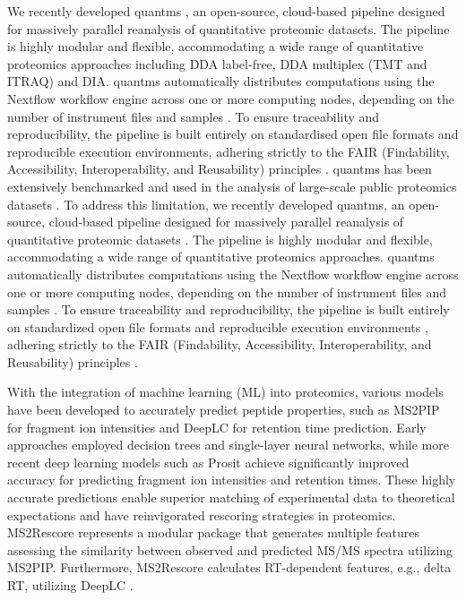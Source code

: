 \documentclass[12pt]{article}
\begin{document}
We recently developed quantms \cite{dai_quantms_2024}, an open-source, cloud-based pipeline designed for massively parallel reanalysis of quantitative proteomic datasets. The pipeline is highly modular and flexible, accommodating a wide range of quantitative proteomics approaches including DDA label-free, DDA multiplex (TMT and ITRAQ) and DIA. quantms automatically distributes computations using the Nextflow workflow engine across one or more computing nodes, depending on the number of instrument files and samples \cite{di_tommaso_nextflow_2017}. To ensure traceability and reproducibility, the pipeline is built entirely on standardised open file formats and reproducible execution environments, adhering strictly to the FAIR (Findability, Accessibility, Interoperability, and Reusability) principles \cite{wilkinson_fair_2016}. quantms has been extensively benchmarked and used in the analysis of large-scale public proteomics datasets \cite{dai_quantms_2024,bai2023lfq, ZHENG2025105440}.
To address this limitation, we recently developed quantms, an open-source, cloud-based pipeline designed for massively parallel reanalysis of quantitative proteomic datasets \cite{dai_quantms_2024}. The pipeline is highly modular and flexible, accommodating a wide range of quantitative proteomics approaches. quantms automatically distributes computations using the Nextflow workflow engine across one or more computing nodes, depending on the number of instrument files and samples \cite{di_tommaso_nextflow_2017}. To ensure traceability and reproducibility, the pipeline is built entirely on standardized open file formats and reproducible execution environments \cite{dai_proteomics_2021} \cite{martens_mzmlcommunity_2011}, adhering strictly to the FAIR (Findability, Accessibility, Interoperability, and Reusability) principles \cite{wilkinson_fair_2016}.

With the integration of machine learning (ML) into proteomics, various models have been developed to accurately predict peptide properties, such as MS2PIP \cite{degroeve_ms2pip_2013} for fragment ion intensities and DeepLC \cite{bouwmeester_deeplc_2021} for retention time prediction. Early approaches employed decision trees and single-layer neural networks, while more recent deep learning models such as Prosit \cite{gessulat_prosit_2019} achieve significantly improved accuracy for predicting fragment ion intensities and retention times. These highly accurate predictions enable superior matching of experimental data to theoretical expectations and have reinvigorated rescoring strategies in proteomics. MS2Rescore represents a modular package that generates multiple features assessing the similarity between observed and predicted MS/MS spectra utilizing MS2PIP. Furthermore, MS2Rescore calculates RT-dependent features, e.g., delta RT, utilizing DeepLC \cite{buur_ms2_2024}.
\end{document}
